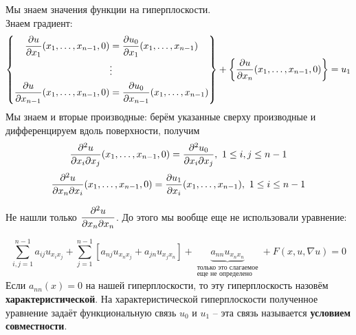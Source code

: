 \documentclass[../main.tex]{subfiles}
\begin{document}
Мы знаем значения функции на гиперплоскости.\\
Знаем градиент:
\begin{equation*}
\left\{\begin{aligned}
\frac{\partial u}{\partial x_1}(x_1, \dots, x_{n-1}, 0) &= \frac{\partial u_0}{\partial x_1}(x_1, \dots, x_{n-1})\\ 
&\vdots \\
\frac{\partial u}{\partial x_{n-1}}(x_1, \dots, x_{n-1}, 0) &= \frac{\partial u_0}{\partial x_{n-1}}(x_1, \dots, x_{n-1})
\end{aligned} \right\}
+\left\{\frac{\partial u}{\partial x_n}(x_1,\dots,x_{n-1},0)\right\} = u_1
\end{equation*}
Мы знаем и вторые производные: берём указанные сверху производные и дифференцируем вдоль поверхности, получим \[\frac{\subd^2u}{\subd x_i\subd x_j}(x_1,\dots,x_{n-1}, 0) = \frac{\subd^2u_0}{\subd x_i\subd x_j},\ 1\le i,j \le n-1 \]
\[\frac{\partial^2u}{\partial x_n\partial x_i}(x_1,\dots,x_{n-1}, 0) = \frac{\partial u_1}{\partial x_i}(x_1,\dots,x_{n-1}),\ 1\le i\le n-1\]

Не нашли только $\displaystyle\frac{\partial^2 u}{\partial x_n\partial x_n}$. До этого мы вообще еще не использовали уравнение:

$$\displaystyle\sum\limits_{i,j=1}^{n-1}a_{ij}u_{x_ix_j} + \displaystyle\sum\limits_{j=1}^{n-1}\left[a_{nj}u_{x_nx_j} + a_{jn}u_{x_jx_n}\right] + \underbrace{a_{nn}u_{x_nx_n}}_{\substack{\text{только это слагаемое}\\ \text{еще не определено}}} + F(x, u, \nabla u) = 0 $$
Если $a_{nn}(x) = 0$ на нашей гиперплоскости, то эту гиперплоскость назовём {\bf характеристической}. На характеристической гиперплоскости полученное уравнение задаёт функциональную связь $u_0$ и $u_1$ -- эта связь называется {\bf условием совместности}.
\end{document}
